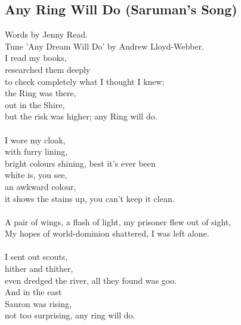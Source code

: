 \begin{multicols}{2}
\section{Any Ring Will Do (Saruman’s Song)}
Words by Jenny Read.
\\
Tune ’Any Dream Will Do’ by Andrew Lloyd-Webber.
\\
I read my books,
\\
researched them deeply
\\
to check completely what I thought I knew;
\\
the Ring was there,
\\
out in the Shire,
\\
but the risk was higher; any Ring will do.
\\
\\
I wore my cloak,
\\
with furry lining,
\\
bright colours shining, best it’s ever been 
\\
white is, you see,
\\
an awkward colour,
\\
it shows the stains up, you can’t keep it clean.
\\
\\
A pair of wings, a flash of light, my prisoner flew out of sight,
\\
My hopes of world-dominion shattered, I was left alone.
\\
\\
I sent out scouts,
\\
hither and thither,
\\
even dredged the river, all they found was goo.
\\
And in the east
\\
Sauron was rising,
\\
not too surprising, any ring will do.
\\
\end{multicols}
